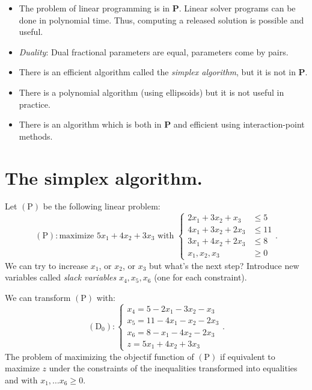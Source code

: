 \documentclass[./main]{subfiles}
\begin{document}
  \begin{rmk}
    \begin{itemize}
      \item The problem of linear programming is in $\mathbf{P}$.
        Linear solver programs can be done in polynomial time.
        Thus, computing a released solution is possible and useful.
      \item \textit{Duality}: Dual fractional parameters are equal, parameters come by pairs.
    \end{itemize}
  \end{rmk}

  \begin{rmk}
    \begin{itemize}
      \item There is an efficient algorithm called the \textit{simplex algorithm}, but it is not in $\mathbf{P}$.
      \item There is a polynomial algorithm (using ellipsoids) but it is not useful in practice.
      \item There is an algorithm which is both in $\mathbf{P}$ and efficient using interaction-point methods.
    \end{itemize}
  \end{rmk}

  \section{The simplex algorithm.}

  Let $(\mathrm{P})$ be the following linear problem:
  \[
    (\mathrm{P}) :
    \text{maximize } 5x_1 + 4x_2 + 3x_3 \text{ with }
    \begin{cases}
    2x_1 + 3x_2 + x_3 &\le 5 \\
    4x_1 + 3 x_2 + 2x_3 &\le 11\\
    3 x_1 + 4x_2 + 2x_3 &\le 8\\
    x_1, x_2, x_3 &\ge 0
  \end{cases}
  .\]
  We can try to increase $x_1$, or $x_2$, or $x_3$ but what's the next step?
  Introduce new variables called \textit{slack variables} $x_4, x_5, x_6$ (one for each constraint).

  We can transform $(\mathrm{P})$ with:
  \[
    (\mathrm{D}_0) : \begin{cases}
    x_4 = 5 - 2x_1 - 3 x_2 - x_3\\
    x_5 = 11 - 4x_1 - x_2 - 2 x_3 \\
    x_6 = 8 - x_1 - 4x_2 - 2x_3\\
    z = 5x_1 + 4x_2 + 3x_3
  \end{cases}
  .\]
  The problem of maximizing the objectif function of $(\mathrm{P})$ if equivalent to maximize $z$ under the constraints of the inequalities transformed into equalities and with $x_1, \ldots x_6 \ge 0$.
\end{document}
